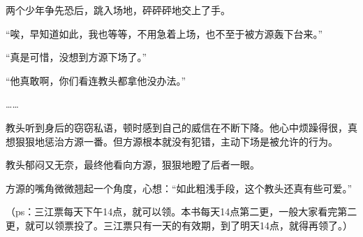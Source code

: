 \begin{this_body}
两个少年争先恐后，跳入场地，砰砰砰地交上了手。

“唉，早知道如此，我也等等，不用急着上场，也不至于被方源轰下台来。”

“真是可惜，没想到方源下场了。”

“他真敢啊，你们看连教头都拿他没办法。”

……

教头听到身后的窃窃私语，顿时感到自己的威信在不断下降。他心中烦躁得很，真想狠狠地惩治方源一番。但方源根本就没有犯错，主动下场是被允许的行为。

教头郁闷又无奈，最终他看向方源，狠狠地瞪了后者一眼。

方源的嘴角微微翘起一个角度，心想：“如此粗浅手段，这个教头还真有些可爱。”

（ps：三江票每天下午14点，就可以领。本书每天14点第二更，一般大家看完第二更，就可以领票投了。三江票只有一天的有效期，到了明天14点，就得再领了。）

\end{this_body}

